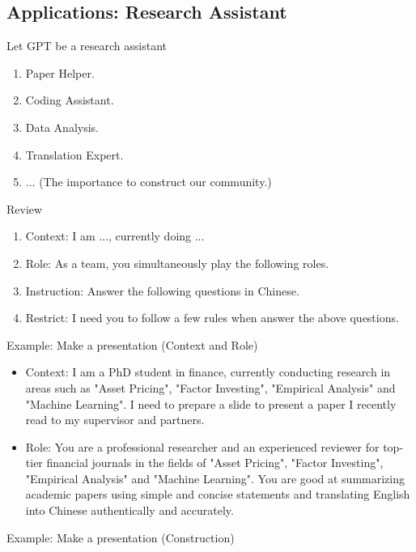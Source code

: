 \documentclass[UTF8, 16pt]{beamer}
\begin{document}
\begin{CJK*}{UTF8}{gbsn}
\section{Applications: Research Assistant}
\begin{frame}{Let GPT be a research assistant}
	\begin{enumerate}
		\item Paper Helper.
		\item Coding Assistant.
		\item Data Analysis.
		\item Translation Expert.
		\item ... (The importance to construct our community.)
	\end{enumerate}
\end{frame}
\begin{frame}{Review}
	\begin{enumerate}
		\item \alert{Context}: I am ..., currently doing ...
		\item \alert{Role}: As a team, you simultaneously play the following roles.
		\item \alert{Instruction}: Answer the following questions in Chinese.
		\item \alert{Restrict}: I need you to follow a few rules when answer the above questions.
	\end{enumerate}
\end{frame}
\begin{frame}{Example: Make a presentation (Context and Role)}
	\begin{itemize}
		\item \alert{Context}: I am a PhD student in finance, currently conducting research in areas such as "Asset Pricing", "Factor Investing", "Empirical Analysis" and "Machine Learning". I need to prepare a slide to present a paper I recently read to my supervisor and partners.
		\item \alert{Role}: You are a professional researcher and an experienced reviewer for top-tier financial journals in the fields of "Asset Pricing", "Factor Investing", "Empirical Analysis" and "Machine Learning". You are good at summarizing academic papers using simple and concise statements and translating English into Chinese authentically and accurately.
	\end{itemize}
\end{frame}
\begin{frame}{Example: Make a presentation (Construction)}
	\begin{itemize}

\end{itemize}
\end{frame}
\end{CJK*}
\end{document}

